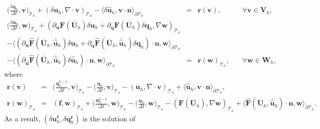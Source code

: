 \documentclass[11pt]{article}
\begin{document}
\begin{equation}
\begin{array}{rcll}
\displaystyle \Big(\frac{\delta \bm{q}_h}{\Delta t}, \bm{v} \Big)_{\mathcal{T}_h} + (\delta \bm{u}_h, \nabla \cdot \bm{v})_{\mathcal{T}_h} - \langle \delta \widehat{\bm{u}}_h, \bm{v} \cdot \bm{n} \rangle_{\partial \mathcal{T}_h}  & = & \bm{r}(\bm{v}), & \quad \forall \bm{v} \in \bm{V}_h, \\[2ex] 
\displaystyle \Big(\frac{\delta \bm{u}_h}{\Delta t}, \bm{w} \Big)_{\mathcal{T}_h} + (\partial_{\bm{u}} \bm{F} (\overline{\bm{U}}_h) \delta \bm{u}_h + \partial_{\bm{q}} \bm{F} (\overline{\bm{U}}_h) \delta \bm{q}_h, \nabla \bm{w})_{\mathcal{T}_h} & & \\[2ex]
 - \langle (\partial_{\bm{u}} \widehat{\bm{F}} (\overline{\bm{U}}_h, \overline{\widehat{\bm{u}}}_h) \delta \bm{u}_h + \partial_{{\bm{q}}} \widehat{\bm{F}} (\overline{\bm{U}}_h, \overline{\widehat{\bm{u}}}_h) \delta {\bm{q}}_h) \cdot \bm{n}, \bm{w} \rangle_{\partial \mathcal{T}_h} & & \\[2ex]
 - \langle (\partial_{\widehat{\bm{u}}} \widehat{\bm{F}} (\overline{\bm{U}}_h, \overline{\widehat{\bm{u}}}_h) \delta \widehat{\bm{u}}_h) \cdot \bm{n}, \bm{w} \rangle_{\partial \mathcal{T}_h}   & = &  \bm{r}(\bm{w})_{\mathcal{T}_h},  & \quad \forall \bm{w} \in \bm{W}_h,
\end{array}
\end{equation}
where
\begin{equation}
\begin{array}{rcl}
 \bm{r}(\bm{v}) & = & \displaystyle \Big(\frac{\bm{q}_h^{k-1}}{\Delta t}, \bm{v} \Big)_{\mathcal{T}_h} - \Big(\frac{\overline{\bm{q}}_h}{\Delta t}, \bm{v}\Big)_{\mathcal{T}_h} - (\overline{\bm{u}}_h, \nabla \cdot \bm{v})_{\mathcal{T}_h} + \langle \overline{\widehat{\bm{u}}}_h, \bm{v} \cdot \bm{n} \rangle_{\partial \mathcal{T}_h},  \\[2ex]
\bm{r}(\bm{w})_{\mathcal{T}_h} & = & (\bm{f}, \bm{w})_{\mathcal{T}_h} + \displaystyle \Big(\frac{\bm{u}_h^{k-1}}{\Delta t}, \bm{w} \Big)_{\mathcal{T}_h} - \Big(\frac{ \overline{\bm{u}}_h}{\Delta t}, \bm{w} \Big)_{\mathcal{T}_h}- (\bm{F} (\overline{\bm{U}}_h), \nabla \bm{w})_{\mathcal{T}_h} + \langle \widehat{\bm{F}} (\overline{\bm{U}}_h, \overline{\widehat{\bm{u}}}_h) \cdot \bm{n}, \bm{w} \rangle_{\partial \mathcal{T}_h} .
\end{array}
\end{equation}
As a result, $(\delta \bm{u}_h^{\bm{r}},\delta \bm{q}_h^{\bm{r}})$ is the solution of
\end{document}
